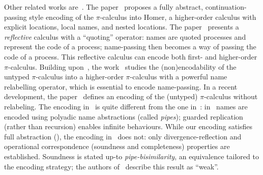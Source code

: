 \documentclass[runningheads]{llncs}
\begin{document}
{%

Other related works are~\cite{BundgaardHG06,DBLP:journals/entcs/MeredithR05,XuActa2012,DBLP:journals/iandc/LanesePSS11}.
The paper~\cite{BundgaardHG06} proposes a fully abstract, contin\-u\-a\-tion-passing style encoding of the 
$\pi$-calculus into Homer, a higher-order  calculus with explicit locations, local names, and nested locations.
The paper~\cite{DBLP:journals/entcs/MeredithR05}
presents a \emph{reflective}  calculus with a ``quoting'' operator: names are quoted processes and represent the code 
of a process; name-passing then becomes a way of passing the code of a process. This reflective calculus 
can encode both first- and higher-order $\pi$-calculus.
Building upon~\cite{ThomsenB:plachoasgcfhop},
the work~\cite{XuActa2012} studies 
the (non)en\-co\-da\-bi\-lity of the untyped $\pi$-calculus into 
a higher-order $\pi$-calculus with a powerful 
name relabelling operator, which is 
essential to encode name-passing. 
In a recent   development, the paper~\cite{DBLP:journals/corr/XuYL15} defines an encoding of the (untyped) $\pi$-calculus 
without relabeling. 
The encoding in~\cite{DBLP:journals/corr/XuYL15} is quite different from the one in~:
in~\cite{DBLP:journals/corr/XuYL15} names are encoded using polyadic name abstractions (called \emph{pipes}); 
guarded replication (rather than recursion) enables infinite behaviours.
While our encoding satisfies full abstraction (), 
the encoding in~\cite{DBLP:journals/corr/XuYL15} does not: only 
divergence-reflection
and 
operational correspondence (soundness and completeness) properties 
are established.
Soundness is stated up-to \emph{pipe-bisimilarity}, an equivalence tailored to the encoding strategy;
the authors of~\cite{DBLP:journals/corr/XuYL15} describe this result as ``weak''.


}
\end{document}
